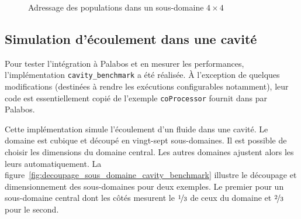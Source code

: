 \begin{figure}[h]
{		\label{fig:cp_index_z_3}
	}
	\caption{Adressage des populations dans un sous-domaine $4\times4$}
	\label{fig:adressage_cp}
\end{figure}

\subsection{Simulation d'écoulement dans une cavité} \label{title-cavity_benchmark}
Pour tester l'intégration à Palabos et en mesurer les performances, l'implémentation \texttt{cavity\_benchmark} a été réalisée. À l'exception de quelques modifications (destinées à rendre les exécutions configurables notamment), leur code est essentiellement copié de l'exemple \texttt{coProcessor} fournit dans par Palabos.

Cette implémentation simule l'écoulement d'un fluide dans une cavité. Le domaine est cubique et découpé en vingt-sept sous-domaines. Il est possible de choisir les dimensions du domaine central. Les autres domaines ajustent alors les leurs automatiquement. La figure~\ref{fig:decoupage_sous_domaine_cavity_benchmark} illustre le découpage et dimensionnement des sous-domaines pour deux exemples. Le premier pour un sous-domaine central dont les côtés mesurent le $\nicefrac{1}{3}$ de ceux du domaine et  $\nicefrac{2}{3}$ pour le second.

